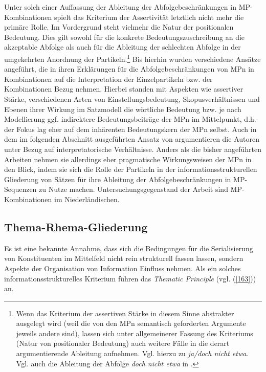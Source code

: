 Unter solch einer Auffassung der Ableitung der Abfolgebeschränkungen in MP-Kombinationen spielt das Kriterium der Assertivität  letztlich nicht mehr die primäre Rolle. Im Vordergrund steht vielmehr die Natur  der positionalen Bedeutung. Dies gilt sowohl für die konkrete Bedeutungszuschreibung an die akzep\-table Abfolge als auch für die Ableitung der schlechten Abfolge in der umgekehrten Anordnung der Partikeln.\footnote{Wenn das Kriterium der assertiven Stärke in diesem Sinne abstrakter ausgelegt wird (weil die von den MPn semantisch geforderten Argumente jeweils andere sind), lassen sich unter allgemeinerer Fassung des Kriteriums (Natur von positionaler Bedeutung) auch weitere Fälle in die derart argumentierende Ableitung aufnehmen. Vgl. hierzu \citet[83-84]{Doherty1985} zu \textit{ja/doch nicht etwa}. Vgl. auch die Ableitung der Abfolge \textit{doch nicht etwa} in \citet[447]{Rinas2007}.}				
Bis hierhin wurden verschiedene Ansätze angeführt, die in ihren Erklärungen für die Abfolgebeschränkungen von MPn in Kombinationen auf die Interpretation der Einzelpartikeln bzw. der Kombinationen Bezug nehmen. Hierbei standen mit Aspekten wie assertiver Stärke, verschiedenen Arten von Einstellungsbedeutung, Skopusverhältnissen und Ebenen ihrer Wirkung im Satzmodell die wörtliche Bedeutung bzw. je nach Modellierung ggf. indirektere Bedeutungsbeiträge der MPn im Mittelpunkt, d.h. der Fokus lag eher auf dem inhärenten Bedeutungskern der MPn selbst. Auch in dem im folgenden Abschnitt ausgeführten Ansatz von \citet{Vriendt1991} argumentieren die Autoren unter Bezug auf interpretatorische Verhältnisse. Anders als die bisher angeführten Arbeiten nehmen sie allerdings eher pragmatische Wirkungsweisen der MPn in den Blick, indem sie sich die Rolle der Partikeln in der informationsstrukturellen Gliederung von Sätzen für ihre Ableitung der Abfolgebeschränkungen in MP-Sequenzen zu Nutze machen. Untersuchungsgegenstand der Arbeit sind MP-Kombinationen im Niederländischen.

\subsection{Thema-Rhema-Gliederung}
Es ist eine bekannte Annahme, dass sich die Bedingungen für die Serialisierung von Konstituenten im Mittelfeld nicht rein strukturell fassen lassen, sondern Aspekte der Organisation von Information Einfluss nehmen. Als ein solches informationsstrukturelles Kriterium führen \citet[44]{Vriendt1991} das \textit{Thematic Principle}  (vgl. (\ref{163})) an.

